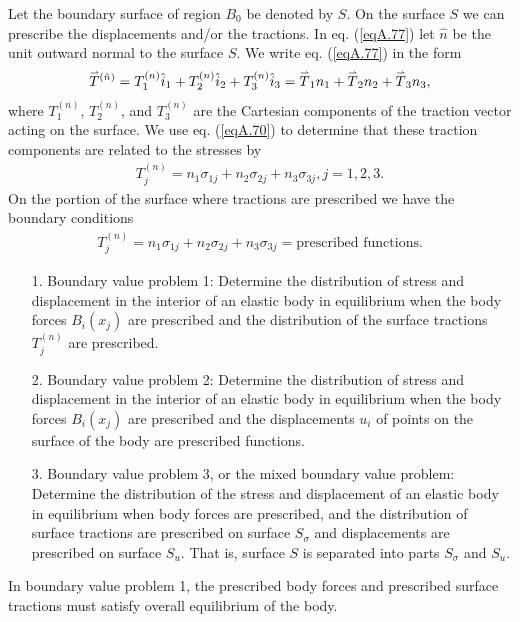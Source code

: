 \documentclass{AeroStructure-ERJohnson}
\def\harp#1{\smash{\mathord{\buildrel{\lower3pt\hbox{$\scriptscriptstyle\rightharpoonup$}}\over{#1}}}}
\begin{document}
Let the boundary surface of region $B_{0}$ be denoted by $S$. On the surface $S$ we can prescribe the displacements and/or the tractions. In eq. (\ref{eqA.77}) let $\hat{n}$  be the unit outward normal to the surface $S$. We write eq. (\ref{eqA.77}) in the form
\begin{align}\label{eqA.148}
\harp{T}^{(\hat{n})}=T_{1}^{(n)} \hat{i}_{1}+T_{2}^{(n)} \hat{i}_{2}+T_{3}^{(n)} \hat{i}_{3}=\harp{T}_{1} n_{1}+\harp{T}_{2} n_{2}+\harp{T}_{3} n_{3},
\end{align}
where $T_{1}^{(n)}$, $T_{2}^{(n)}$, and $T_{3}^{(n)}$ are the Cartesian components of the traction vector acting on the surface. We use eq. (\ref{eqA.70}) to determine that these traction components are related to the stresses by
\begin{align}\label{eqA.149}
T_{j}^{(n)}=n_{1} \sigma_{1 j}+n_{2} \sigma_{2 j}+n_{3} \sigma_{3 j}, j=1,2,3.
\end{align}
On the portion of the surface where tractions are prescribed we have the boundary conditions
\begin{align}\label{eqA.150}
T_{j}^{(n)}=n_{1} \sigma_{1 j}+n_{2} \sigma_{2 j}+n_{3} \sigma_{3 j}= \text{prescribed functions}.
\end{align}
\vspace*{-2\baselineskip}
\begin{enumerate}[2.]
\item[1.] Boundary value problem 1: Determine\enlargethispage{-1\baselineskip} the distribution of stress and displacement in the interior of an elastic body in equilibrium when the body forces $B_{i}(x_{j})$ are prescribed and the distribution of the surface tractions $T_{j}^{(n)}$ are prescribed.

\item[2.] Boundary value problem 2: Determine the distribution of stress and displacement in the interior of an elastic body in equilibrium when the body forces $B_{i}(x_{j})$ are prescribed and the displacements $u_{i}$ of points on the surface of the body are prescribed functions.

\item[3.] Boundary value problem 3, or the mixed boundary value problem: Determine the distribution of the stress and displacement of an elastic body in equilibrium when body forces are prescribed, and the distribution of surface tractions are prescribed on surface $S_{\sigma}$ and displacements are prescribed on surface $S_{u}$. That is, surface $S$ is separated into parts $S_{\sigma}$ and $S_{u}$.
\end{enumerate}
In boundary value problem 1, the prescribed body forces and prescribed surface tractions must satisfy overall equilibrium of the body.
\end{document}
